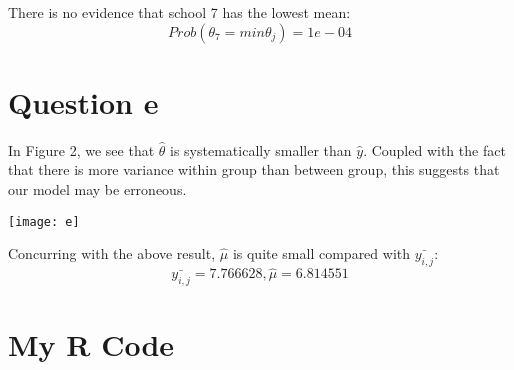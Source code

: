 \documentclass[12pt]{article}
\begin{document}
There is no evidence that school 7 has the lowest mean:
\begin{equation}
Prob(\theta_{7}= min\theta_{j} ) = 1e-04
\end{equation}

\section*{Question e}

In Figure 2, we see that $\hat{\theta}$ is systematically smaller than $\hat{y}$. Coupled with the fact that there is more variance within group than between group, this suggests that our model may be erroneous.

\begin{center}
\texttt{[image: e]}
\end{center}

Concurring with the above result, $\hat{\mu}$ is quite small compared with $\bar{y_{i,j}}$:
\begin{equation}
\bar{y_{i,j}} = 7.766628 , \hat{\mu} = 6.814551
\end{equation}

\section*{My R Code}

\end{document}
